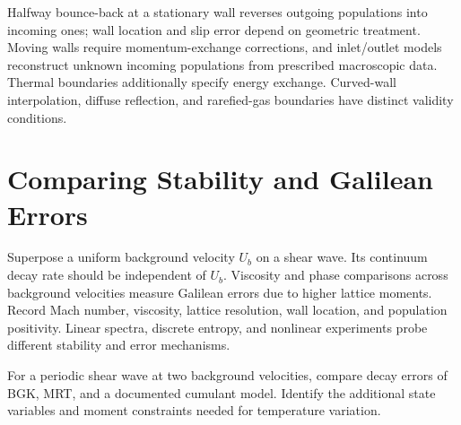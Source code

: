 Halfway bounce-back at a stationary wall reverses outgoing populations into incoming ones;
wall location and slip error depend on geometric treatment. Moving walls require momentum-exchange corrections,
and inlet/outlet models reconstruct unknown incoming populations from prescribed macroscopic data.
Thermal boundaries additionally specify energy exchange. Curved-wall interpolation, diffuse reflection, and rarefied-gas boundaries have distinct validity conditions.

\section{Comparing Stability and Galilean Errors}
Superpose a uniform background velocity $U_b$ on a shear wave. Its continuum decay rate should be independent of $U_b$.
Viscosity and phase comparisons across background velocities measure Galilean errors due to higher lattice moments.
Record Mach number, viscosity, lattice resolution, wall location, and population positivity.
Linear spectra, discrete entropy, and nonlinear experiments probe different stability and error mechanisms.

{For a periodic shear wave at two background velocities, compare decay errors of BGK, MRT, and a documented cumulant model. Identify the additional state variables and moment constraints needed for temperature variation.}
